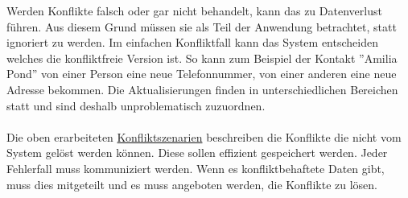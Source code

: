 Werden Konflikte falsch oder gar nicht behandelt, kann das zu Datenverlust führen.
Aus diesem Grund müssen sie als Teil der Anwendung betrachtet, statt ignoriert zu werden.
Im einfachen Konfliktfall kann das System entscheiden welches die konfliktfreie Version ist.
So kann zum Beispiel der Kontakt ''Amilia Pond'' von einer Person eine neue Telefonnummer, von einer anderen eine neue Adresse bekommen.
Die Aktualisierungen finden in unterschiedlichen Bereichen statt und sind deshalb unproblematisch zuzuordnen.\\\\
Die oben erarbeiteten \hyperref[chap:konfliktszenarien]{Konfliktszenarien} beschreiben die Konflikte die nicht vom System gelöst werden können.
Diese sollen effizient gespeichert werden.
Jeder Fehlerfall muss kommuniziert werden. Wenn es konfliktbehaftete Daten gibt, muss dies mitgeteilt und es muss angeboten werden, die Konflikte zu lösen.
